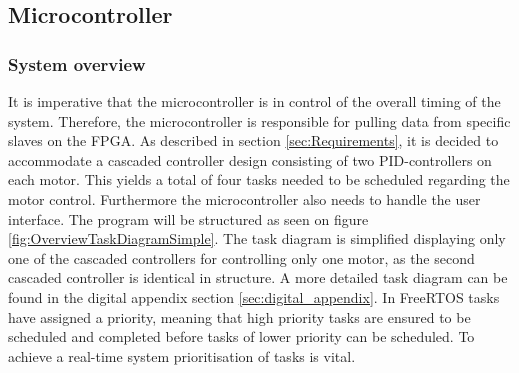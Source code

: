 \documentclass[../../main.tex]{subfiles}
\begin{document}
\subsection{Microcontroller} \label{subsec:SystemImplementationMicroController}

\subsubsection*{System overview}
\label{subsec:SystemImplementationOperatingSystem}
It is imperative that the microcontroller is in control of the overall timing of the system. Therefore, the microcontroller is responsible for pulling data from specific slaves on the FPGA. As described in section \ref{sec:Requirements}, it is decided to accommodate a cascaded controller design consisting of two PID-controllers on each motor. This yields a total of four tasks needed to be scheduled regarding the motor control. Furthermore the microcontroller also needs to handle the user interface. The program will be structured as seen on figure \ref{fig:OverviewTaskDiagramSimple}. The task diagram is simplified displaying only one of the cascaded controllers for controlling only one motor, as the second cascaded controller is identical in structure. A more detailed task diagram can be found in the digital appendix section \ref{sec:digital_appendix}. In FreeRTOS tasks have assigned a priority, meaning that high priority tasks are ensured to be scheduled and completed before tasks of lower priority can be scheduled. To achieve a real-time system prioritisation of tasks is vital.






\end{document}
